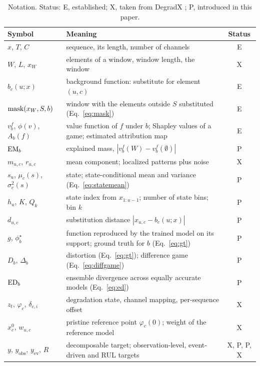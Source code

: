 \documentclass{article}
\begin{document}
\begin{table}[t]
\caption{Notation. Status: E, established; X, taken from DegradX \citep{degradx2026}; P, introduced in this paper.}
\label{tab:notation}
\centering
\small
\begin{tabularx}{\linewidth}{@{}l>{\raggedright\arraybackslash}Xc@{}}
\toprule
Symbol & Meaning & Status \\
\midrule
$x$, $T$, $C$ & sequence, its length, number of channels & E \\
$W$, $L$, $x_W$ & elements of a window, window length, the window & X \\
$b_c(u;x)$ & background function: substitute for element $(u,c)$ & E \\
$\operatorname{mask}(x_W,S,b)$ & window with the elements outside $S$ substituted (Eq.~\ref{eq:mask}) & E \\
$v^f_b$, $\phi(v)$, $A_b(f)$ & value function of $f$ under $b$; Shapley values of a game; estimated attribution map & E \\
$\mathrm{EM}_b$ & explained mass, $|v^f_b(W)-v^f_b(\emptyset)|$ & P \\
$m_{u,c}$, $r_{u,c}$ & mean component; localized patterns plus noise & X \\
$s_u$, $\mu_c(s)$, $\sigma^2_c(s)$ & state; state-conditional mean and variance (Eq.~\ref{eq:statemean}) & P \\
$h_u$, $K$, $Q_k$ & state index from $x_{1:u-1}$; number of state bins; bin $k$ & P \\
$d_{u,c}$ & substitution distance $|x_{u,c}-b_c(u;x)|$ & P \\
$g$, $\phi^\star_b$ & function reproduced by the trained model on its support; ground truth for $b$ (Eq.~\ref{eq:gt}) & P \\
$D_b$, $\Delta_b$ & distortion (Eq.~\ref{eq:gt}); difference game (Eq.~\ref{eq:diffgame}) & P \\
$\mathrm{ED}_b$ & ensemble divergence across equally accurate models (Eq.~\ref{eq:ed}) & P \\
$z_t$, $\varphi_c$, $\delta_{c,i}$ & degradation state, channel mapping, per-sequence offset & X \\
$x^0_c$, $w_{u,c}$ & pristine reference point $\varphi_c(0)$; weight of the reference model & X \\
$y$, $y_{\mathrm{obs}}$, $y_{\mathrm{ev}}$, $R$ & decomposable target; observation-level, event-driven and RUL targets & X, P, P, X \\
\bottomrule
\end{tabularx}
\end{table}
\end{document}
